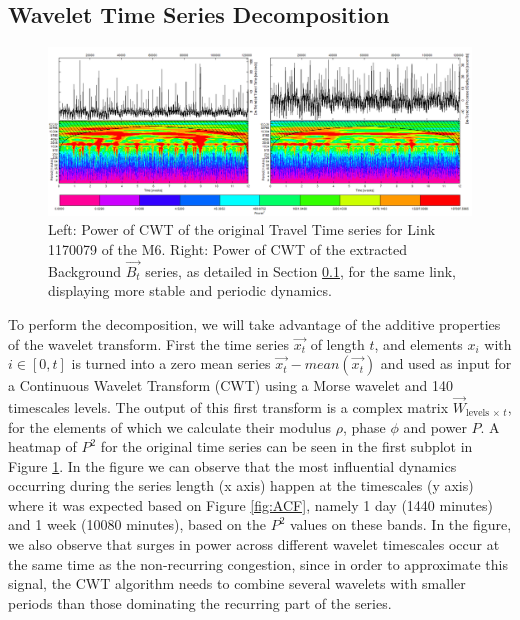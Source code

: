 \documentclass[a4paper, 10pt, conference]{ieeeconf}      %
\begin{document}
\subsection{Wavelet Time Series Decomposition}\label{decomposition}
\begin{figure}[htbp]
	\centerline{\includegraphics[width=\linewidth]{./images/WT_combined_1500_600.png}}
	\caption{Left: Power of CWT of the original Travel Time series for Link 1170079 of the M6.
	Right: Power of CWT of the extracted Background $\vec{B_t}$ series, as detailed in Section \ref{decomposition}, for the same link, displaying more stable and periodic dynamics.}
	\label{fig:wt}
\end{figure}
To perform the decomposition, we will take advantage of the additive properties of the wavelet transform. First the time series $\vec{x_t}$ of length $t$, and elements $x_i$ with $i \in [0,t]$ is turned into a zero mean series $\vec{x_t} - mean(\vec{x_t})$ and used as input for a Continuous Wavelet Transform (CWT) \cite{daubechies} \cite{mallat} using a Morse wavelet \cite{morse} and 140 timescales levels.
The output of this first transform is a complex matrix $\vec{W}_{\textrm{levels}\,\times\, t}$, for the elements of which we calculate their modulus $\rho$, phase $\phi$ and power $P$. 
A heatmap of $P^2$ for the original time series can be seen in the first subplot in Figure \ref{fig:wt}.
In the figure we can observe that the most influential dynamics occurring during the series length (x axis) happen at the timescales (y axis) where it was expected based on Figure \ref{fig:ACF}, namely 1 day (1440 minutes) and 1 week (10080 minutes), based on the $P^2$ values on these bands.
In the figure, we also observe that surges in power across different wavelet timescales occur at the same time as the non-recurring congestion, since in order to approximate this signal, the CWT algorithm needs to combine several wavelets with smaller periods than those dominating the recurring part of the series. 
\end{document}
